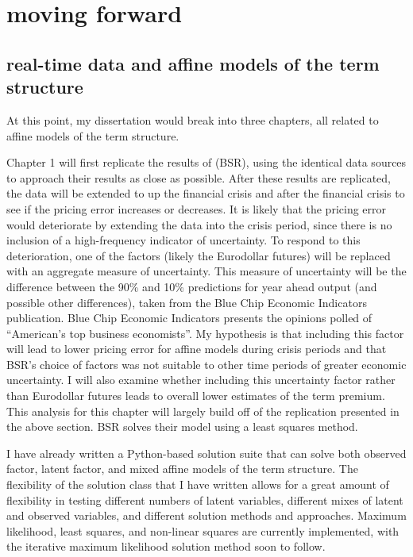 \documentclass{article}
\numberwithin{equation}{section}
\begin{document}
\section{moving forward}

\subsection{real-time data and affine models of the term structure}

At this point, my dissertation would break into three chapters, all related to
affine models of the term structure.

Chapter 1 will first replicate the results of \citet{sack2005monetary} (BSR),
using the identical data sources to approach their results as close as
possible. After these results are replicated, the data will be extended to up
the financial crisis and after the financial crisis to see if the pricing error
increases or decreases. It is likely that the pricing error would deteriorate
by extending the data into the crisis period, since there is no inclusion of
a high-frequency indicator of uncertainty. To respond to this deterioration,
one of the factors (likely the Eurodollar futures) will be replaced with an
aggregate measure of uncertainty. This measure of uncertainty will be the
difference between the 90\% and 10\% predictions for year ahead output (and
possible other differences), taken from the Blue Chip Economic Indicators
publication. Blue Chip Economic Indicators presents the opinions polled of
``American's top business economists''. My hypothesis is that including this
factor will lead to lower pricing error for affine models during crisis periods
and that BSR's choice of factors was not suitable to other time periods of
greater economic uncertainty. I will also examine whether including this
uncertainty factor rather than Eurodollar futures leads to overall lower
estimates of the term premium. This analysis for this chapter will largely
build off of the replication presented in the above section. BSR solves their
model using a least squares method.

I have already written a Python-based solution suite that can solve both
observed factor, latent factor, and mixed affine models of the term structure.
The flexibility of the solution class that I have written allows for a great
amount of flexibility in testing different numbers of latent variables,
different mixes of latent and observed variables, and different solution
methods and approaches. Maximum likelihood, least squares, and non-linear
squares are currently implemented, with the \citet{ang2003no} iterative maximum
likelihood solution method soon to follow.
\end{document}
